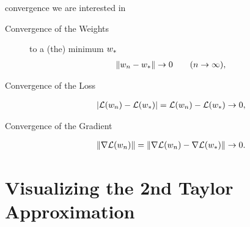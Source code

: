convergence we are interested in
\begin{description}
	\item[Convergence of the Weights] to a (the) minimum \(w_*\)
	\begin{align*}
		\|w_n - w_*\| \to 0 \qquad (n\to\infty),
	\end{align*}
	\item[Convergence of the Loss]
	\begin{align*}
		|\mathcal{L}(w_n) - \mathcal{L}(w_*)|
		=\mathcal{L}(w_n) - \mathcal{L}(w_*) \to 0,
	\end{align*}
	\item[Convergence of the Gradient]
	\begin{align*}
		\|\nabla\mathcal{L}(w_n)\|
		= \|\nabla\mathcal{L}(w_n) - \nabla\mathcal{L}(w_*)\| \to 0.
	\end{align*}
\end{description}

\section{Visualizing the 2nd Taylor Approximation}\label{sec: visualize gd}

